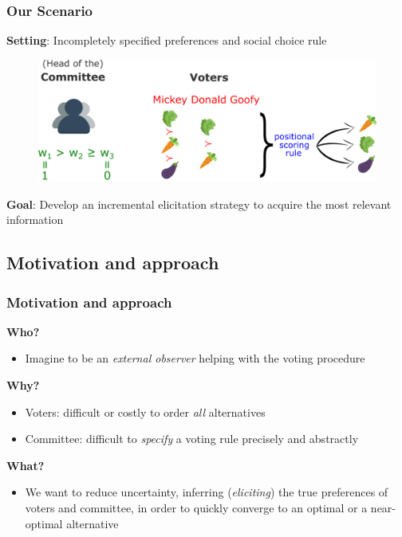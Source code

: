 \documentclass{beamer}
\begin{document}
\begin{frame}
\frametitle{Our Scenario}
\textbf{Setting}: Incompletely specified preferences and social choice rule
\begin{figure}
	\includegraphics[scale=0.35]{setting3.png}
\end{figure}
 \textbf{Goal}: Develop an incremental elicitation strategy to acquire the most relevant information 
\end{frame}

\subsection{Motivation and approach}
\begin{frame}
	\frametitle{Motivation and approach}
	\textbf{Who?}
	\begin{itemize}
		\item Imagine to be an \emph{external observer} helping with the voting procedure
	\end{itemize}
	 \textbf{Why?}
	\begin{itemize}
		\item Voters: difficult or costly to order \emph{all} alternatives
		\item Committee: difficult to \emph{specify} a voting rule precisely and abstractly
	\end{itemize}
	 \textbf{What?}
	\begin{itemize}
		\item We want to reduce uncertainty, inferring (\textit{eliciting}) the true preferences of voters and committee, in order to quickly converge to an optimal
		or a near-optimal alternative
	\end{itemize}		
\end{frame}
\end{document}
